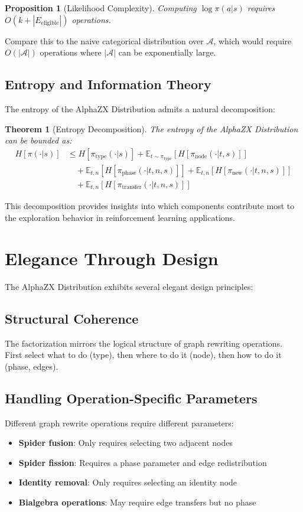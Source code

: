 \documentclass[11pt,a4paper]{article}
\newtheorem{theorem}{Theorem}
\newtheorem{proposition}{Proposition}
\newcommand{\E}{\mathbb{E}}
\newcommand{\cA}{\mathcal{A}}
\begin{document}
\begin{proposition}[Likelihood Complexity]
Computing $\log \pi(a|s)$ requires $O(k + |E_{\text{eligible}}|)$ operations.
\end{proposition}

Compare this to the naive categorical distribution over $\cA$, which would require $O(|\cA|)$ operations where $|\cA|$ can be exponentially large.

\subsection{Entropy and Information Theory}

The entropy of the AlphaZX Distribution admits a natural decomposition:

\begin{theorem}[Entropy Decomposition]
The entropy of the AlphaZX Distribution can be bounded as:
\begin{align}
H[\pi(\cdot|s)] &\leq H[\pi_{\text{type}}(\cdot|s)] + \E_{t \sim \pi_{\text{type}}}[H[\pi_{\text{node}}(\cdot|t,s)]] \\
&\quad + \E_{t,n}[H[\pi_{\text{phase}}(\cdot|t,n,s)]] + \E_{t,n}[H[\pi_{\text{new}}(\cdot|t,n,s)]] \\
&\quad + \E_{t,n}[H[\pi_{\text{transfer}}(\cdot|t,n,s)]]
\end{align}
\end{theorem}

This decomposition provides insights into which components contribute most to the exploration behavior in reinforcement learning applications.

\section{Elegance Through Design}

The AlphaZX Distribution exhibits several elegant design principles:

\subsection{Structural Coherence}
The factorization mirrors the logical structure of graph rewriting operations. First select what to do (type), then where to do it (node), then how to do it (phase, edges).

\subsection{Handling Operation-Specific Parameters}
Different graph rewrite operations require different parameters:
\begin{itemize}
    \item \textbf{Spider fusion}: Only requires selecting two adjacent nodes
    \item \textbf{Spider fission}: Requires a phase parameter and edge redistribution
    \item \textbf{Identity removal}: Only requires selecting an identity node
    \item \textbf{Bialgebra operations}: May require edge transfers but no phase
\end{itemize}
\end{document}
